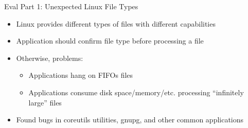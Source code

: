 \documentclass[pdf]{beamer}
\begin{document}
\begin{frame}{Eval Part 1: Unexpected Linux File Types}
  \begin{itemize}
    \item{Linux provides different types of files with different capabilities}
    \item{Application should confirm file type before processing a file}
    \item{Otherwise, problems:}
      \begin{itemize}
        \item{Applications hang on FIFOs files}
        \item{Applications consume disk space/memory/etc. processing ``infinitely
          large'' files}
      \end{itemize}
    \item{Found bugs in coreutils utilities, gnupg, and other common
        applications}
  \end{itemize}
\end{frame}
\end{document}
